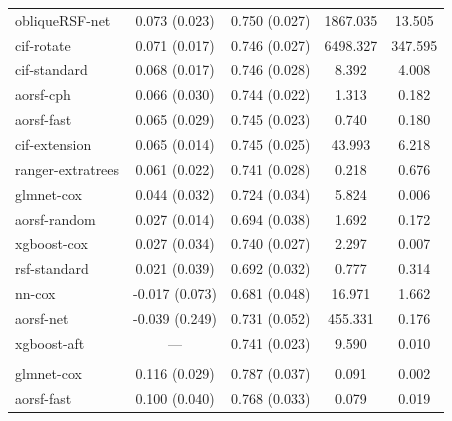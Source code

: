 \documentclass[twoside,11pt]{article}\usepackage[]{graphicx}\usepackage[]{xcolor}
\newenvironment{knitrout}{}{} %
\begin{document}
\begin{knitrout}
\begin{longtable}[t]{lcccc}
\hline
\hspace{1em}obliqueRSF-net & 0.073 (0.023) & 0.750 (0.027) & 1867.035 & 13.505\\
\hspace{1em}cif-rotate & 0.071 (0.017) & 0.746 (0.027) & 6498.327 & 347.595\\
\hspace{1em}cif-standard & 0.068 (0.017) & 0.746 (0.028) & 8.392 & 4.008\\
\hspace{1em}aorsf-cph & 0.066 (0.030) & 0.744 (0.022) & 1.313 & 0.182\\
\hspace{1em}aorsf-fast & 0.065 (0.029) & 0.745 (0.023) & 0.740 & 0.180\\
\hspace{1em}cif-extension & 0.065 (0.014) & 0.745 (0.025) & 43.993 & 6.218\\
\hspace{1em}ranger-extratrees & 0.061 (0.022) & 0.741 (0.028) & 0.218 & 0.676\\
\hspace{1em}glmnet-cox & 0.044 (0.032) & 0.724 (0.034) & 5.824 & 0.006\\
\hspace{1em}aorsf-random & 0.027 (0.014) & 0.694 (0.038) & 1.692 & 0.172\\
\hspace{1em}xgboost-cox & 0.027 (0.034) & 0.740 (0.027) & 2.297 & 0.007\\
\hspace{1em}rsf-standard & 0.021 (0.039) & 0.692 (0.032) & 0.777 & 0.314\\
\hspace{1em}nn-cox & -0.017 (0.073) & 0.681 (0.048) & 16.971 & 1.662\\
\hspace{1em}aorsf-net & -0.039 (0.249) & 0.731 (0.052) & 455.331 & 0.176\\
\hspace{1em}xgboost-aft & --- & 0.741 (0.023) & 9.590 & 0.010\\
\addlinespace[0.3em]
\multicolumn{5}{l}{\textit{\textbf{FCL; death, n = 541, p = 7}}}\\
\hline
\hspace{1em}glmnet-cox & 0.116 (0.029) & 0.787 (0.037) & 0.091 & 0.002\\
\hspace{1em}aorsf-fast & 0.100 (0.040) & 0.768 (0.033) & 0.079 & 0.019\\

\end{longtable}
\end{knitrout}
\end{document}
